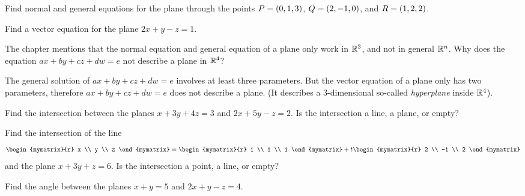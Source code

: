 \begin{enumialphparenastyle}
\begin{ex}
  Find normal and general equations for the plane through the points
  $P = \left(0,1,3\right)$, $Q=\left(2,-1,0\right)$, and $R=\left(1,2,2\right)$.
\end{ex}

\begin{ex}
  Find a vector equation for the plane $2x+y-z=1$.
\end{ex}

\begin{ex}
  The chapter mentions that the normal equation and general equation
  of a plane only work in $\mathbb{R}^3$, and not in general $\mathbb{R}^n$. Why does
  the equation $ax+by+cz+dw=e$ not describe a plane in $\mathbb{R}^4$?
  \begin{sol}
    The general solution of $ax+by+cz+dw=e$ involves at least three
    parameters.  But the vector equation of a plane only has two
    parameters, therefore $ax+by+cz+dw=e$ does not describe a
    plane. (It describes a 3-dimensional so-called {\em
      hyperplane} inside
    $\mathbb{R}^4$).
  \end{sol}
\end{ex}

\begin{ex}
  Find the intersection between the planes $x+3y+4z=3$ and $2x+5y-z=2$.
  Is the intersection a line, a plane, or empty?
\end{ex}

\begin{ex}
Find the intersection of the line
  \begin{equation*}
    \begin{mymatrix}{r} x \\ y \\ z \end{mymatrix}
    = \begin{mymatrix}{r} 1 \\ 1 \\ 1 \end{mymatrix}
    + t \begin{mymatrix}{r} 2 \\ -1 \\ 2 \end{mymatrix}
  \end{equation*}
  and the plane $x+3y+z = 6$.
  Is the intersection a point, a line, or empty?
\end{ex}

\begin{ex}
  Find the angle between the planes $x+y=5$ and $2x+y-z=4$.
\end{ex}


\end{enumialphparenastyle}
